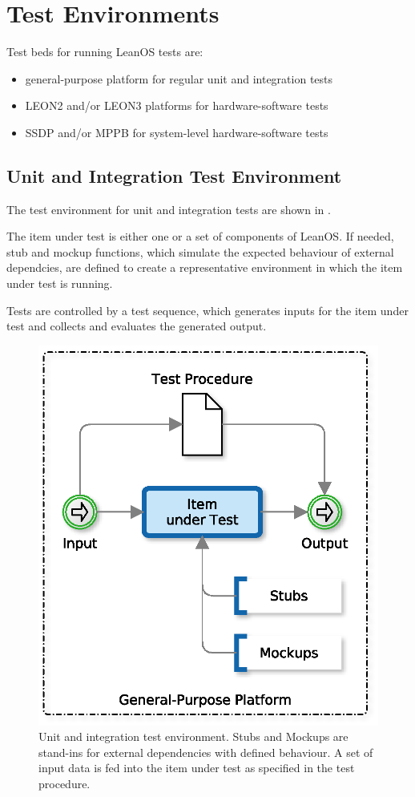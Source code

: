 \chapter{Test Environments}

Test beds for running LeanOS tests are:

\begin{itemize}
	\item general-purpose platform for regular unit and integration tests
	\item \gls{LEON2} and/or \gls{LEON3} platforms for hardware-software tests
	\item \gls{SSDP} and/or \gls{MPPB} for system-level hardware-software tests
\end{itemize}


\section{Unit and Integration Test Environment}

The test environment for unit and integration tests are shown in
.

The item under test is either one or a set of components of LeanOS. If needed,
stub and mockup functions, which simulate the expected behaviour of external
dependcies, are defined to create a representative environment in which the item
under test is running.

Tests are controlled by a test sequence, which generates inputs for the item
under test and collects and evaluates the generated output.


\begin{figure}[h]
\begin{center}
	\includegraphics[width=0.5\columnwidth]{images/unittest}
	\caption{Unit and integration test environment. Stubs and Mockups%
	are stand-ins for external dependencies with defined behaviour.%
	A set of input data is fed into the item under test as specified
	in the test procedure.}
	\label{fig:unittest}
\end{center}
\end{figure}


